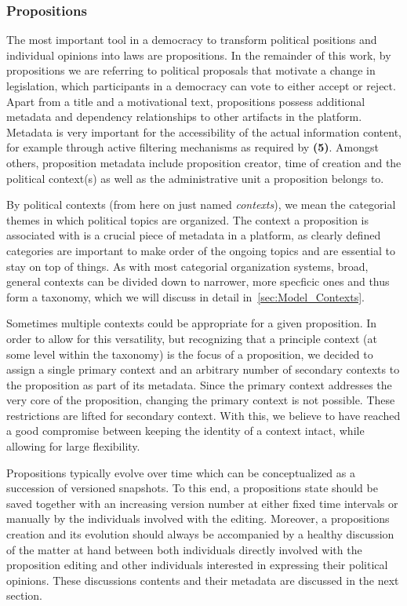 \subsubsection{Propositions}
\label{sec:Model_Propositions}
The most important tool in a democracy to transform political positions and individual opinions into laws are propositions.
In the remainder of this work, by propositions we are referring to political proposals that motivate a change in legislation, which participants in a democracy can vote to either accept or reject.
Apart from a title and a motivational text, propositions possess additional metadata and dependency relationships to other artifacts in the platform.
Metadata is very important for the accessibility of the actual information content, for example through active filtering mechanisms as required by \textbf{(5)}.
Amongst others, proposition metadata include proposition creator, time of creation and the political context(s) as well as the administrative unit a proposition belongs to.

By political contexts (from here on just named \textit{contexts}), we mean the categorial themes in which political topics are organized.
The context a proposition is associated with is a crucial piece of metadata in a  platform, as  clearly defined categories are important to make order of the ongoing topics and are essential to stay on top of things.
As with most categorial organization systems, broad, general contexts can be divided down to narrower, more specficic ones and thus form a taxonomy, which we will discuss in detail in~\ref{sec:Model_Contexts}.

Sometimes multiple contexts could be appropriate for a given proposition. In order to allow for this versatility, but recognizing that a principle context (at some level within the taxonomy) is the focus of a proposition, we decided to assign a single primary context and an arbitrary number of secondary contexts to the proposition as part of its metadata. Since the primary context addresses the very core of the proposition, changing the primary context is not possible. These restrictions are lifted for secondary context. With this, we believe to have reached a good compromise between keeping the identity of a context intact, while allowing for large flexibility.

Propositions typically evolve over time which can be conceptualized as a succession of versioned snapshots.
To this end, a propositions state should be saved together with an increasing version number at either fixed time intervals or manually by the individuals involved with the editing.
Moreover, a propositions creation and its evolution should always be accompanied by a healthy discussion of the matter at hand between both individuals directly involved with the proposition editing and other individuals interested in expressing their political opinions.
These discussions contents and their metadata are discussed in the next section.

